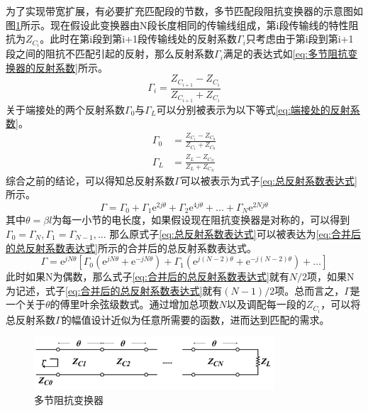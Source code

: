 \documentclass[master]{thesis-uestc}
\begin{document}
为了实现带宽扩展，有必要扩充匹配段的节数，多节匹配段阻抗变换器的示意图如图\ref{fig:多节阻抗变换器}所示。现在假设此变换器由N段长度相同的传输线组成，第i段传输线的特性阻抗为\(Z_{C_i}\)。此时在第i段到第i+1段传输线处的反射系数\(\Gamma_i\)只考虑由于第i段到第i+1段之间的阻抗不匹配引起的反射，那么反射系数\(\Gamma_i\)满足的表达式如\ref{eq:多节阻抗变换器的反射系数}所示。
\begin{equation}\label{eq:多节阻抗变换器的反射系数}
    \Gamma_i = \frac{Z_{C_{i+1}}-Z_{C_{i}}}{Z_{C_{i+1}}+Z_{C_{i}}}
\end{equation}
关于端接处的两个反射系数\(\Gamma_0\)与\(\Gamma_L\)可以分别被表示为以下等式\ref{eq:端接处的反射系数}。
\begin{subequations}\label{eq:端接处的反射系数}
    \begin{align}
        \Gamma_0 &= \frac{Z_{C_1}-Z_{C_0}}{Z_{C_1}+Z_{C_0}} \\
        \Gamma_L &= \frac{Z_L-Z_{C_N}}{Z_L+Z_{C_N}}
    \end{align}
\end{subequations}
综合之前的结论，可以得知总反射系数\(\Gamma\)可以被表示为式子\ref{eq:总反射系数表达式}所示。
\begin{equation}\label{eq:总反射系数表达式}
    \Gamma = \Gamma_0+\Gamma_1 \mathrm{e}^{2 j \theta}+\Gamma_2 \mathrm{e}^{4 j \theta}+...+\Gamma_N \mathrm{e}^{2 N j \theta}
\end{equation}
其中\(\theta = \beta l\)为每一小节的电长度，如果假设现在阻抗变换器是对称的，可以得到\(\Gamma_0 = \Gamma_N, \Gamma_1 = \Gamma_{N-1}, \dots \)
那么原式子\ref{eq:总反射系数表达式}可以被表达为\ref{eq:合并后的总反射系数表达式}所示的合并后的总反射系数表达式。
\begin{equation}\label{eq:合并后的总反射系数表达式}
    \Gamma = \mathrm{e}^{j  N \theta} \left[\Gamma_0\left(\mathrm{e}^{j N \theta}+\mathrm{e}^{- j N \theta} \right) + \Gamma_1\left(\mathrm{e}^{j (N-2) \theta}+\mathrm{e}^{- j (N-2) \theta} \right) + \dots \right]
\end{equation}
此时如果N为偶数，那么式子\ref{eq:合并后的总反射系数表达式}就有\(N/2\)项，如果N为记述，式子\ref{eq:合并后的总反射系数表达式}就有\((N-1)/2\)项。总而言之，\(\Gamma\)是一个关于\(\theta\)的傅里叶余弦级数式。通过增加总项数\(N\)以及调配每一段的\(Z_{C_i}\)，可以将总反射系数\(\Gamma\)的幅值设计近似为任意所需要的函数，进而达到匹配的需求。
\begin{figure}[!htb]
    \centering
    \includegraphics[width=0.8\textwidth]{pic/chapter2/多节阻抗匹配示意图.png}
    \caption{多节阻抗变换器}
    \label{fig:多节阻抗变换器}
\end{figure}
\end{document}

